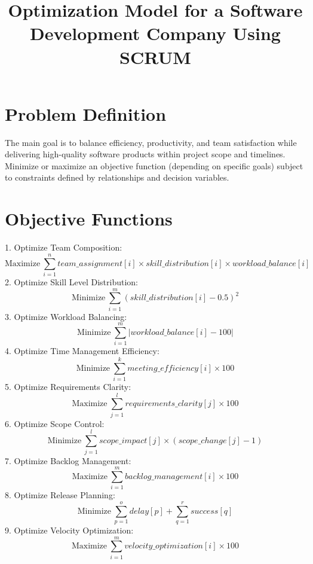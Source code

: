 \documentclass{article}
\begin{document}
\title{Optimization Model for a Software Development Company Using SCRUM}
\author{}
\date{}

\maketitle

\section{Problem Definition}
The main goal is to balance efficiency, productivity, and team satisfaction while delivering high-quality software products within project scope and timelines. Minimize or maximize an objective function (depending on specific goals) subject to constraints defined by relationships and decision variables.

\section{Objective Functions}

1. Optimize Team Composition:
\[
\text{{Maximize}} \ \sum_{i=1}^{n} team\_assignment[i] \times skill\_distribution[i] \times workload\_balance[i]
\]
2. Optimize Skill Level Distribution:
\[
\text{{Minimize}} \ \sum_{i=1}^{m} (skill\_distribution[i] - 0.5)^2
\]
3. Optimize Workload Balancing:
\[
\text{{Minimize}} \ \sum_{i=1}^{m} |workload\_balance[i] - 100|
\]
4. Optimize Time Management Efficiency:
\[
\text{{Minimize}} \ \sum_{i=1}^{k} meeting\_efficiency[i] \times 100
\]
5. Optimize Requirements Clarity:
\[
\text{{Maximize}} \ \sum_{j=1}^{l} requirements\_clarity[j] \times 100
\]
6. Optimize Scope Control:
\[
\text{{Minimize}} \ \sum_{j=1}^{l} scope\_impact[j] \times (scope\_change[j] - 1)
\]
7. Optimize Backlog Management:
\[
\text{{Maximize}} \ \sum_{i=1}^{m} backlog\_management[i] \times 100
\]
8. Optimize Release Planning:
\[
\text{{Minimize}} \ \sum_{p=1}^{o} delay[p] + \sum_{q=1}^{r} success[q]
\]
9. Optimize Velocity Optimization:
\[
\text{{Maximize}} \ \sum_{i=1}^{m} velocity\_optimization[i] \times 100
\]
\end{document}
